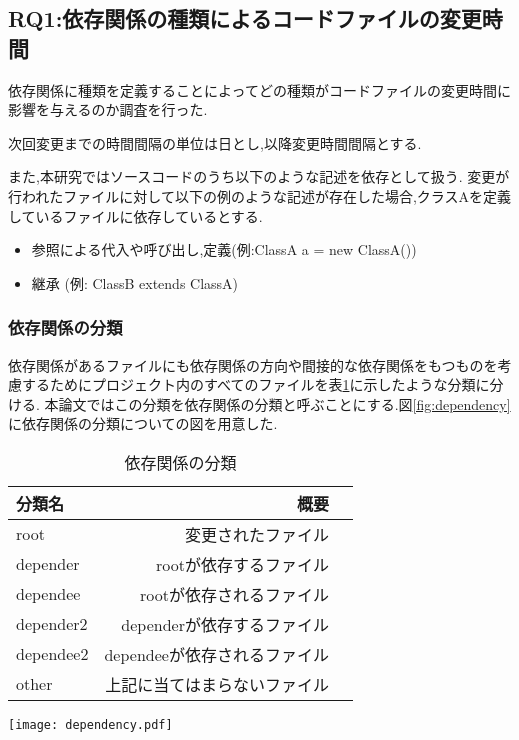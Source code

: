 \documentclass[submit,ses,noauthor]{ipsj} %
\begin{document}
\subsection{RQ1:依存関係の種類によるコードファイルの変更時間}
依存関係に種類を定義することによってどの種類がコードファイルの変更時間に影響を与えるのか調査を行った.

次回変更までの時間間隔の単位は日とし,以降変更時間間隔とする.

また,本研究ではソースコードのうち以下のような記述を依存として扱う.
変更が行われたファイルに対して以下の例のような記述が存在した場合,クラスAを定義しているファイルに依存しているとする.

\begin{itemize}
\item 参照による代入や呼び出し,定義(例:ClassA a = new ClassA())
\item 継承 (例: ClassB extends ClassA)
\end{itemize}

\subsubsection{依存関係の分類}
依存関係があるファイルにも依存関係の方向や間接的な依存関係をもつものを考慮するためにプロジェクト内のすべてのファイルを表\ref{tab:依存関係の分類}に示したような分類に分ける.
本論文ではこの分類を依存関係の分類と呼ぶことにする.図\ref{fig:dependency}に依存関係の分類についての図を用意した.

\begin{table}
\caption{依存関係の分類}
\begin{tabular}{|l|r|r|} \hline
分類名 & 概要 \\ \hline
root & 変更されたファイル \\ \hline
depender & rootが依存するファイル \\ \hline
dependee & rootが依存されるファイル \\ \hline
depender2 & dependerが依存するファイル \\ \hline
dependee2 & dependeeが依存されるファイル \\ \hline
other & 上記に当てはまらないファイル \\ \hline
\end{tabular}
\label{tab:依存関係の分類}
\end{table}

\begin{figure*}[t]
\centering
\texttt{[image: dependency.pdf]}
\caption{依存関係の分類図}
\label{fig:dependency} 
\end{figure*}
\end{document}

